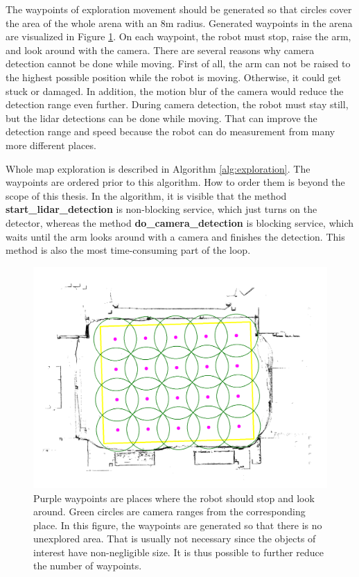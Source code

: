 The waypoints of exploration movement should be generated so that circles cover the area of the whole arena with an $8$m radius. Generated waypoints in the arena are visualized in Figure \ref{fig:map_annot}. On each waypoint, the robot must stop, raise the arm, and look around with the camera. There are several reasons why camera detection cannot be done while moving. First of all, the arm can not be raised to the highest possible position while the robot is moving. Otherwise, it could get stuck or damaged. In addition, the motion blur of the camera would reduce the detection range even further. During camera detection, the robot must stay still, but the lidar detections can be done while moving. That can improve the detection range and speed because the robot can do measurement from many more different places. 

Whole map exploration is described in Algorithm \ref{alg:exploration}. The waypoints are ordered prior to this algorithm. How to order them is beyond the scope of this thesis. In the algorithm, it is visible that the method \textbf{start\_lidar\_detection} is non-blocking service, which just turns on the detector, whereas the method \textbf{do\_camera\_detection} is blocking service, which waits until the arm looks around with a camera and finishes the detection. This method is also the most time-consuming part of the loop.

\begin{figure}[H]
	\centering
	\includegraphics[scale=0.25]{fig/map_annotation.png}
	\caption[Generated waypoints]{Purple waypoints are places where the robot should stop and look around. Green circles are camera ranges from the corresponding place. In this figure, the waypoints are generated so that there is no unexplored area. That is usually not necessary since the objects of interest have non-negligible size. It is thus possible to further reduce the number of waypoints.}
	\label{fig:map_annot}
\end{figure}

